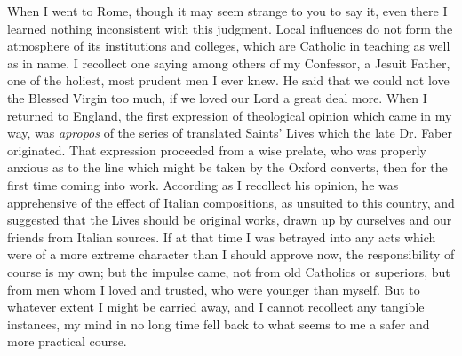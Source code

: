 When I went to Rome, though it may seem strange to you to say it,
even there I learned nothing inconsistent with this judgment. Local
influences do not form the atmosphere of its institutions and colleges,
which are Catholic in teaching as well as in name. I recollect one
saying among others of my Confessor, a Jesuit Father, one of the
holiest, most prudent men I ever knew. He said that we could not love
the Blessed Virgin too much, if we loved our Lord a great deal more.
When I returned to England, the first expression of theological opinion
which came in my way, was \emph{apropos} of the series of translated
Saints' Lives which the late Dr. Faber originated. That expression
proceeded from a wise prelate, who was properly anxious as to the line
which might be taken by the Oxford converts, then for the first time
coming into work. According as I recollect his opinion, he was
apprehensive of the effect of Italian compositions, as unsuited to this
country, and suggested that the Lives should be original works, drawn up
by ourselves and our friends from Italian sources. If at that time I was
betrayed into any acts which were of a more extreme character than I
should approve now, the responsibility of course is my own; but the
impulse came, not from old Catholics or superiors, but from men whom I
loved and trusted, who were younger than myself. But to whatever extent
I might be carried away, and I cannot recollect any tangible instances,
my mind in no long time fell back to what seems to me a safer and more
practical course.

